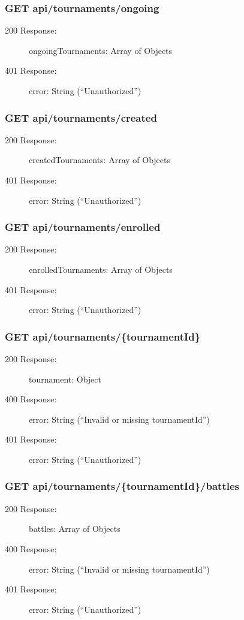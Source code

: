\documentclass{Configuration_Files/Template}
\begin{document}
\subsubsection{GET api/tournaments/ongoing}
\begin{description}
    \item[200 Response:] ongoingTournaments: Array of Objects
    \item[401 Response:] error: String (“Unauthorized”)
\end{description}

\subsubsection{GET api/tournaments/created}
\begin{description}
    \item[200 Response:] createdTournaments: Array of Objects
    \item[401 Response:] error: String (“Unauthorized”)
\end{description}

\subsubsection{GET api/tournaments/enrolled}
\begin{description}
    \item[200 Response:] enrolledTournaments: Array of Objects
    \item[401 Response:] error: String (“Unauthorized”)
\end{description}

\subsubsection{GET api/tournaments/\{tournamentId\}}
\begin{description}
    \item[200 Response:] tournament: Object
    \item[400 Response:] error: String (“Invalid or missing tournamentId”)
    \item[401 Response:] error: String (“Unauthorized”)
\end{description}

\subsubsection{GET api/tournaments/\{tournamentId\}/battles}
\begin{description}
    \item[200 Response:] battles: Array of Objects
    \item[400 Response:] error: String (“Invalid or missing tournamentId”)
    \item[401 Response:] error: String (“Unauthorized”)
\end{description}
\end{document}
